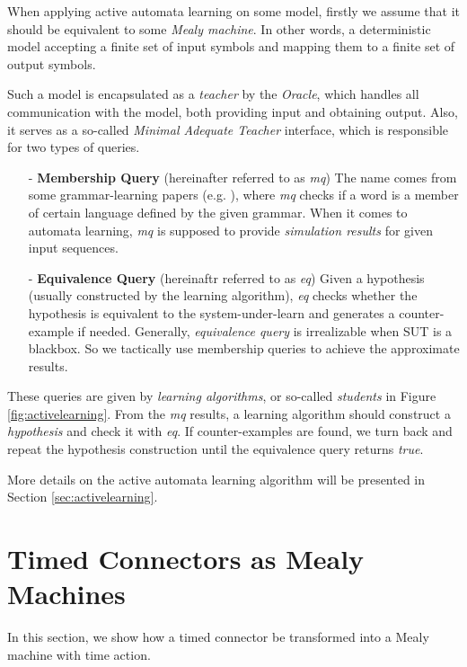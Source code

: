 \documentclass[conference, a4paper]{IEEEtran}
\begin{document}
When applying active automata learning on some model, firstly we assume that it should be equivalent
to some \emph{Mealy machine}. In other words, a deterministic model accepting a finite set of input
symbols and mapping them to a finite set of output symbols.

Such a model is encapsulated as a \emph{teacher} by the \emph{Oracle}, which handles
all communication with the model, both providing input and obtaining output. Also, it serves as a
so-called \emph{Minimal Adequate Teacher} interface, which is responsible for two types of
queries. 

\begin{itemize}
  \item[-] \textbf{Membership Query} (hereinafter referred to as \emph{mq}) The name comes from
    some grammar-learning papers (e.g. \cite{DBLP:journals/iandc/Angluin87}), where \emph{mq} checks
    if a word is a member of certain language defined by the given grammar. When it comes to
    automata learning, \emph{mq} is supposed to provide \emph{simulation results} for given input
    sequences.
  \item[-] \textbf{Equivalence Query} (hereinaftr referred to as \emph{eq}) Given a hypothesis
    (usually constructed by the learning algorithm), \emph{eq} checks whether the hypothesis is
    equivalent to the system-under-learn and generates a counter-example if needed. Generally, 
    \emph{equivalence query} is irrealizable when SUT is a blackbox. So we tactically use membership
    queries to achieve the approximate results.
\end{itemize}

These queries are given by \emph{learning algorithms}, or so-called \emph{students} in Figure
\ref{fig:activelearning}. From the \emph{mq} results, a learning algorithm should construct a
\emph{hypothesis} and check it with \emph{eq}. If counter-examples are found, we turn back and
repeat the hypothesis construction until the equivalence query returns \emph{true}.

More details on the active automata learning algorithm will be presented in Section
\ref{sec:activelearning}. 

\section{Timed Connectors as Mealy Machines}
\label{sec:semantics}
In this section, we show how a timed connector be transformed into a Mealy machine with time action.
\end{document}
